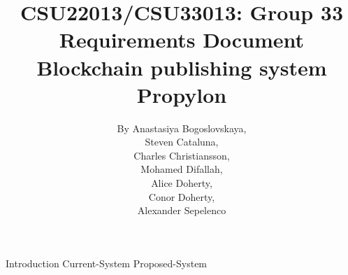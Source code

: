 \documentclass{article}
\title{
	{CSU22013/CSU33013: Group 33}\\
	{Requirements Document}\\
	{Blockchain publishing system}\\
	{\large Propylon}
}
\author{
	{By Anastasiya Bogoslovskaya,}\\
	{Steven Cataluna,} \\
	{Charles Christiansson,} \\
    {Mohamed Difallah,} \\
	{Alice Doherty,} \\
	{Conor Doherty,} \\
	{Alexander Sepelenco}
}
\date{}
\begin{document}
\maketitle
\tableofcontents

{Introduction}
{Current-System}
{Proposed-System}
\end{document}
